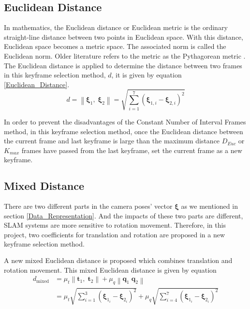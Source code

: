 \subsection{Euclidean Distance}
In mathematics, the Euclidean distance or Euclidean metric is the ordinary straight-line distance between two points in Euclidean space. With this distance, Euclidean space becomes a metric space. The associated norm is called the Euclidean norm. Older literature refers to the metric as the Pythagorean metric \parencite{EuclideanDistance}. The Euclidean distance is applied to determine the distance between two frames in this keyframe selection method, $d$, it is given by equation \ref{Euclidean_Distance}.
\begin{equation}
    d=\left\|\boldsymbol{\xi}_{1}, \; \boldsymbol{\xi}_{2}\right\|=\sqrt{\sum_{i=1}^{7}\left(\boldsymbol{\xi}_{1,i}-\boldsymbol{\xi}_{2,i}\right)^{2}}
    \label{Euclidean_Distance}
\end{equation}

In order to prevent the disadvantages of the Constant Number of Interval Frames method, in this keyframe selection method, once the Euclidean distance between the current frame and last keyframe is large than the maximum distance $D_{Euc}$ or $K_{max}$ frames have passed from the last keyframe, set the current frame as a new keyframe.

\subsection{Mixed Distance}
\label{Subsection_Mixed_Distance}
There are two different parts in the camera poses' vector $\boldsymbol{\xi}$ as we mentioned in section \ref{Data_Representation}. And the impacts of these two parts are different, SLAM systems are more sensitive to rotation movement. Therefore, in this project, two coefficients for translation and rotation are proposed in a new keyframe selection method.

A new mixed Euclidean distance is proposed which combines translation and rotation movement. This mixed Euclidean distance is given by equation 
\begin{equation}
    \begin{aligned}
        d_{\text {mixed}} &=\mu_{t}\left\|\boldsymbol{t}_{1}, \; \boldsymbol{t}_{2}\right\|+\mu_{q}\left\|\boldsymbol{q}_{1} \; \boldsymbol{q}_{2}\right\| \\
        &=\mu_{t} \sqrt{\sum_{i=1}^{3}\left(\boldsymbol{\xi}_{1_{i}}-\boldsymbol{\xi}_{2_{i}}\right)^{2}}+\mu_{q} \sqrt{\sum_{i=4}^{7}\left(\boldsymbol{\xi}_{1_{i}}-\boldsymbol{\xi}_{2_{i}}\right)^{2}}
    \end{aligned}
    \label{New_Euclidean_Distance}
\end{equation}

